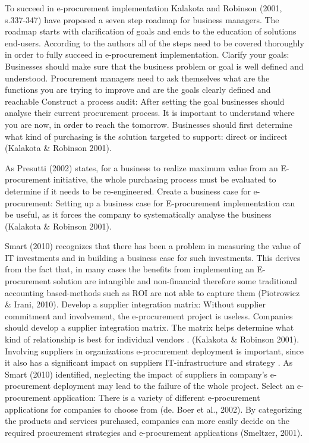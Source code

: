 To succeed in e-procurement implementation Kalakota and Robinson (2001, s.337-347) have proposed a seven step roadmap for business managers. The roadmap starts with clarification of goals and ends to the education of solutions end-users. According to the authors all of the steps need to be covered thoroughly in order to fully succeed in e-procurement implementation. Clarify your goals: Businesses should make sure that the business problem or goal is well defined and understood. Procurement managers need to ask themselves what are the functions you are trying to improve and are the goals clearly defined and reachable Construct a process audit: After setting the goal businesses should analyse their current procurement process. It is important to understand where you are now, in order to reach the tomorrow. Businesses should first determine what kind of purchasing is the solution targeted to support: direct or indirect (Kalakota \& Robinson 2001). %

As Presutti (2002) states, for a business to realize maximum value from an E-procurement initiative, the whole purchasing process must be evaluated to determine if it needs to be re-engineered. Create a business case for e-procurement: Setting up a business case for E-procurement implementation can be useful, as it forces the company to systematically analyse the business (Kalakota \& Robinson 2001).

 Smart (2010) recognizes that there has been a problem in measuring the value of IT investments and in building a business case for such investments. This derives from the fact that, in many cases the benefits from implementing an E-procurement solution are intangible and non-financial therefore some traditional accounting based-methods such as ROI are not able to capture them (Piotrowicz \& Irani, 2010). 
Develop a supplier integration matrix: Without supplier commitment and involvement, the e-procurement project is useless. Companies should develop a supplier integration matrix. The matrix helps determine what kind of relationship is best for individual vendors \citep{kala2001}.  (Kalakota \& Robinson 2001). 
Involving suppliers in organizations e-procurement deployment is important, since it also has a significant impact on suppliers IT-infrastructure and strategy \citep{croom2005}. %
As Smart (2010) identified, neglecting the impact of suppliers in company's e-procurement deployment may lead to the failure of the whole project. Select an e-procurement application: There is a variety of different e-procurement applications for companies to choose from (de. Boer et al., 2002).  By categorizing the products and services purchased, companies can more easily decide on the required procurement strategies and e-procurement applications (Smeltzer, 2001).  

